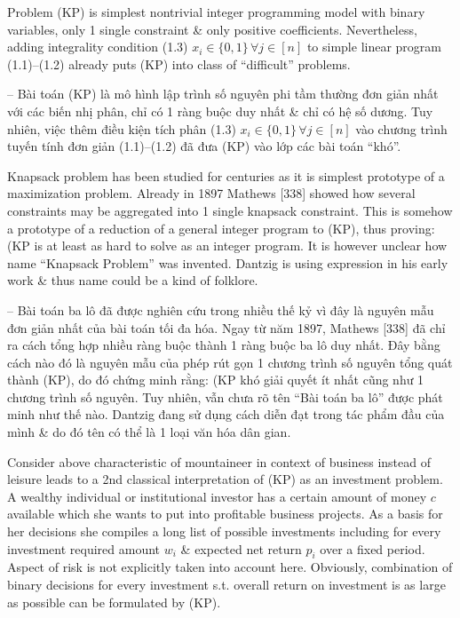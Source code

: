 \documentclass{article}
\begin{document}
\begin{itemize}
\begin{itemize}
        Problem (KP) is simplest nontrivial integer programming model with binary variables, only 1 single constraint \& only positive coefficients. Nevertheless, adding integrality condition (1.3) $x_i\in\{0,1\}\,\forall j\in[n]$ to simple linear program (1.1)--(1.2) already puts (KP) into class of ``difficult'' problems.

        -- Bài toán (KP) là mô hình lập trình số nguyên phi tầm thường đơn giản nhất với các biến nhị phân, chỉ có 1 ràng buộc duy nhất \& chỉ có hệ số dương. Tuy nhiên, việc thêm điều kiện tích phân (1.3) $x_i\in\{0,1\}\,\forall j\in[n]$ vào chương trình tuyến tính đơn giản (1.1)--(1.2) đã đưa (KP) vào lớp các bài toán ``khó''.

        Knapsack problem has been studied for centuries as it is simplest prototype of a maximization problem. Already in 1897 Mathews [338] showed how several constraints may be aggregated into 1 single knapsack constraint. This is somehow a prototype of a reduction of a general integer program to (KP), thus proving: (KP is at least as hard to solve as an integer program. It is however unclear how name ``Knapsack Problem''  was invented. {\sc Dantzig} is using expression in his early work \& thus name could be a kind of folklore.

        -- Bài toán ba lô đã được nghiên cứu trong nhiều thế kỷ vì đây là nguyên mẫu đơn giản nhất của bài toán tối đa hóa. Ngay từ năm 1897, Mathews [338] đã chỉ ra cách tổng hợp nhiều ràng buộc thành 1 ràng buộc ba lô duy nhất. Đây bằng cách nào đó là nguyên mẫu của phép rút gọn 1 chương trình số nguyên tổng quát thành (KP), do đó chứng minh rằng: (KP khó giải quyết ít nhất cũng như 1 chương trình số nguyên. Tuy nhiên, vẫn chưa rõ tên ``Bài toán ba lô'' được phát minh như thế nào. {\sc Dantzig} đang sử dụng cách diễn đạt trong tác phẩm đầu của mình \& do đó tên có thể là 1 loại văn hóa dân gian.

        Consider above characteristic of mountaineer in context of business instead of leisure leads to a 2nd classical interpretation of (KP) as an investment problem. A wealthy individual or institutional investor has a certain amount of money $c$ available which she wants to put into profitable business projects. As a basis for her decisions she compiles a long list of possible investments including for every investment required amount $w_i$ \& expected net return $p_i$ over a fixed period. Aspect of risk is not explicitly taken into account here. Obviously, combination of binary decisions for every investment s.t. overall return on investment is as large as possible can be formulated by (KP).


\end{itemize}
\end{itemize}
\end{document}
